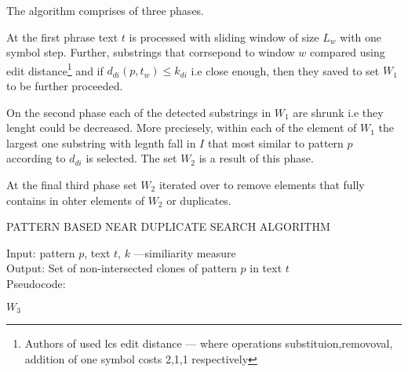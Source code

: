 The algorithm comprises of three phases.

At the first phrase  text $t$ is processed with sliding window of size $L_{w}$ with one symbol step.
Further, substrings that corrsepond to window $w$ compared using edit distance\footnote{Authors of \cite{} used lcs edit distance --- where  operations substituion,removoval, addition of one symbol costs 2,1,1 respectively} and if $d_{di}(p,t_{w}) \leq k_{di}$ i.e  close enough, then they saved to set $W_{1}$ to be further proceeded. 

On the second phase  each of the detected substrings in $W_{1}$ are shrunk i.e they lenght could be decreased.
More preciesely, within each of the element of $W_{1}$ the largest one substring with legnth fall in $I$ that most similar to pattern $p$ according to $d_{di}$ is selected.
The set $W_{2}$ is a result of this phase.

At the final third phase  set $W_{2}$ iterated over to remove elements that fully contains in ohter elements of $W_{2}$ or duplicates.


\begin{algorithm}[H]
\caption{PATTERN BASED NEAR DUPLICATE
SEARCH ALGORITHM}\cite{}
\label{alg:luciv}
Input: pattern $p$, text $t$, $k$ ---similiarity measure\\
Output: Set of non-intersected clones of pattern $p$ in text $t$\\
Pseudocode:
\begin{algorithmic}[1]
\ENDIF
\ENDFOR
{}

\ENDIF
\ENDFOR
\ENDFOR
{}
\ENDFOR


\ENDIF
\ENDFOR
\RETURN $W_3$

\end{algorithmic}
\end{algorithm}

